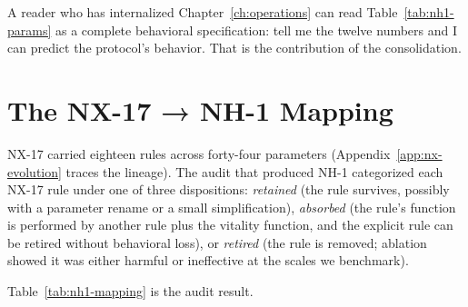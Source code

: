 \documentclass[twoside,nobib]{tufte-book}
\begin{document}
A reader who has internalized Chapter~\ref{ch:operations} can
read Table~\ref{tab:nh1-params} as a complete behavioral
specification: tell me the twelve numbers and I can predict the
protocol's behavior. That is the contribution of the consolidation.

\section{The NX-17 → NH-1 Mapping}
\label{sec:nh1-mapping}

NX-17 carried eighteen rules across forty-four parameters
(Appendix~\ref{app:nx-evolution} traces the lineage). The audit
that produced NH-1 categorized each NX-17 rule under one of three
dispositions: \emph{retained} (the rule survives, possibly with a
parameter rename or a small simplification), \emph{absorbed} (the
rule's function is performed by another rule plus the vitality
function, and the explicit rule can be retired without behavioral
loss), or \emph{retired} (the rule is removed; ablation showed it
was either harmful or ineffective at the scales we benchmark).

Table~\ref{tab:nh1-mapping} is the audit result.
\end{document}
